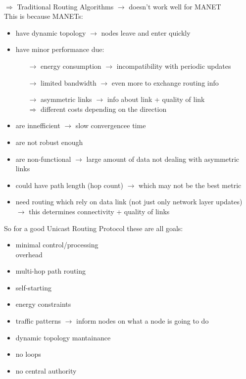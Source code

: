 \\[0.3cm]
$\Rightarrow$ Traditional Routing Algorithms $\rightarrow$ doesn't work well for MANET\\
This is because MANETs:
\begin{itemize}
    \item have dynamic topology $\rightarrow$ nodes leave and enter quickly
    \item have minor performance due:
    \begin{itemize}
        \item[$\rightarrow$] energy consumption $\rightarrow$ incompatibility with periodic updates
        \item[$\rightarrow$] limited bandwidth $\rightarrow$ even more to exchange routing info
        \item[$\rightarrow$] asymmetric links $\rightarrow$ info about link + quality of link\\
        $\Rightarrow$ different costs depending on the direction
    \end{itemize}
    \item are innefficient $\rightarrow$ slow convergencee time
    \item are not robust enough
    \item are non-functional $\rightarrow$ large amount of data not dealing with asymmetric links
    \item could have path length (hop count) $\rightarrow$ which may not be the best metric
    \item need routing which rely on data link (not just only network layer updates)\\
    $\rightarrow$ this determines connectivity + quality of links
\end{itemize}
So for a good Unicast Routing Protocol these are all goals:\\[0.3cm]
\begin{minipage}{.5\linewidth}
    \begin{itemize}
        \item minimal control/processing\\overhead
        \item multi-hop path routing
        \item self-starting
        \item energy constraints
        \end{itemize}
\end{minipage}
\begin{minipage}{.5\linewidth}
    \begin{itemize}
        \item traffic patterns $\rightarrow$ inform nodes on what a node is going to do
        \item dynamic topology mantainance
        \item no loops
        \item no central authority
        \end{itemize}
\end{minipage}

